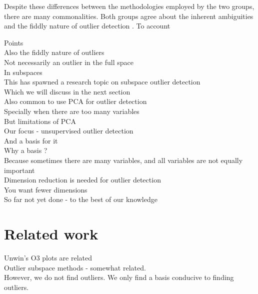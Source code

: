 \documentclass[11pt]{article}
\begin{document}
Despite these differences between the methodologies employed by the two groups, there are many commonalities. Both groups agree about the inherent ambiguities and the fiddly nature of outlier detection \citep{unwin2019multivariate, campos2016evaluation}. To account   



Points \\


Also the fiddly nature of outliers \\ 
Not necessarily an outlier in the full space \\
In subspaces \\
This has spawned a research topic on subspace outlier detection \\ 
Which we will discuss in the next section \\
Also common to use PCA for outlier detection \\
Specially when there are too many variables \\
But limitations of PCA \\

Our focus - unsupervised outlier detection \\
And a basis for it \\
Why a basis ?  \\
Because sometimes there are many variables, and all variables are not equally important \\
Dimension reduction is needed for outlier detection \\
You want fewer dimensions \\
So far not yet done - to the best of our knowledge \\





\section{Related work}
Unwin's O3 plots are related \\
Outlier subspace methods - somewhat related.  \\
However, we do not find outliers. We only find a basis conducive to finding outliers. \\
\end{document}
